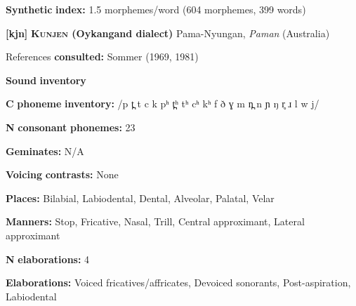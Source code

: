 \begin{styleBody}
\textbf{Synthetic} \textbf{index:} 1.5 morphemes/word (604 morphemes, 399 words)
\end{styleBody}

\begin{styleBody}
\textbf{[kjn]}   \textbf{\textsc{Kunjen} \textbf{(Oykangand} \textbf{dialect)}}  Pama-Nyungan, \textit{Paman} (Australia)
\end{styleBody}

\begin{styleBody}
References \textbf{consulted:} Sommer (1969, 1981)
\end{styleBody}

\begin{styleBody}
\textbf{Sound} \textbf{inventory}
\end{styleBody}

\begin{styleBody}
\textbf{C} \textbf{phoneme} \textbf{inventory:} /p t̪ t c k pʰ t̪ʰ tʰ cʰ kʰ f ð ɣ m n̪ n ɲ ŋ r̥ ɹ l w j/
\end{styleBody}

\begin{styleBody}
\textbf{N} \textbf{consonant} \textbf{phonemes:} 23
\end{styleBody}

\begin{styleBody}
\textbf{Geminates:} N/A
\end{styleBody}

\begin{styleBody}
\textbf{Voicing} \textbf{contrasts:} None
\end{styleBody}

\begin{styleBody}
\textbf{Places:} Bilabial, Labiodental, Dental, Alveolar, Palatal, Velar
\end{styleBody}

\begin{styleBody}
\textbf{Manners:} Stop, Fricative, Nasal, Trill, Central approximant, Lateral approximant
\end{styleBody}

\begin{styleBody}
\textbf{N} \textbf{elaborations:} 4
\end{styleBody}

\begin{styleBody}
\textbf{Elaborations:} Voiced fricatives/affricates, Devoiced sonorants, Post-aspiration, Labiodental
\end{styleBody}

